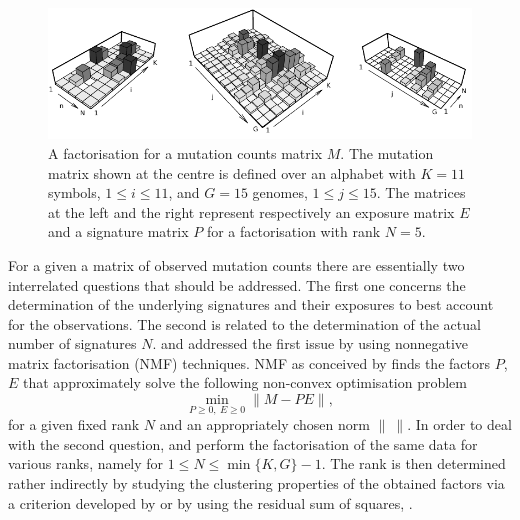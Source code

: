 \documentclass{bioinfo}
\begin{document}
\begin{figure}
 \centering\includegraphics[width=14cm]{figs/f_bw_t}
 \caption{\textrm{%
  A factorisation for a mutation counts matrix $M$. The
  mutation matrix shown at the centre is defined over an alphabet with
  $K=11$ symbols, $1 \leqslant i \leqslant 11$, and $G=15$ genomes,
  $1\leqslant j\leqslant 15$. The matrices at the left and the right 
  represent respectively an exposure  matrix $E$ and a signature matrix
  $P$ for a factorisation with rank $N=5$.
  }
 }
\label{fig:toyNMF}
\end{figure}

For a given a matrix of observed mutation counts there are essentially
two interrelated questions that should be addressed. The first one
concerns the determination of the underlying signatures and their
exposures to best account for the observations. The second is related
to the determination of the actual number of signatures
$N$. \cite{NCell} and \cite{A} addressed the first issue by using
nonnegative matrix factorisation (NMF) techniques.  NMF as conceived
by \cite{LS} finds the factors $P$, $E$ that approximately solve the
following non-convex optimisation problem
\begin{equation}
  \label{eqn:NMF}
    \min_{P\geqslant 0,\ E\geqslant 0}\|M - PE\|,
\end{equation}
for a given fixed rank $N$ and an appropriately chosen norm $\|\ \|$.
In order to deal with the second question, \cite{NCell} and \cite{A}
perform the factorisation of the same data for various ranks, namely
for $1 \leq N \leq \min\{K, G\}-1$. The rank is then determined rather 
indirectly by studying the clustering properties of the obtained
factors via a criterion developed by \cite{BTGM} or by using the
residual sum of squares, \cite{HMSG}.
\end{document}
